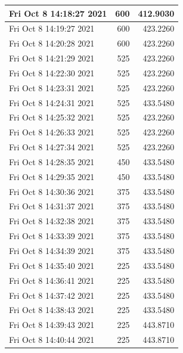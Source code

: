 \begin{longtable}{|l|r|r|}
Fri Oct  8 14:18:27 2021 &                600 &        412.9030 \\ \hline
Fri Oct  8 14:19:27 2021 &                600 &        423.2260 \\ \hline
Fri Oct  8 14:20:28 2021 &                600 &        423.2260 \\ \hline
Fri Oct  8 14:21:29 2021 &                525 &        423.2260 \\ \hline
Fri Oct  8 14:22:30 2021 &                525 &        423.2260 \\ \hline
Fri Oct  8 14:23:31 2021 &                525 &        423.2260 \\ \hline
Fri Oct  8 14:24:31 2021 &                525 &        433.5480 \\ \hline
Fri Oct  8 14:25:32 2021 &                525 &        423.2260 \\ \hline
Fri Oct  8 14:26:33 2021 &                525 &        423.2260 \\ \hline
Fri Oct  8 14:27:34 2021 &                525 &        423.2260 \\ \hline
Fri Oct  8 14:28:35 2021 &                450 &        433.5480 \\ \hline
Fri Oct  8 14:29:35 2021 &                450 &        433.5480 \\ \hline
Fri Oct  8 14:30:36 2021 &                375 &        433.5480 \\ \hline
Fri Oct  8 14:31:37 2021 &                375 &        433.5480 \\ \hline
Fri Oct  8 14:32:38 2021 &                375 &        433.5480 \\ \hline
Fri Oct  8 14:33:39 2021 &                375 &        433.5480 \\ \hline
Fri Oct  8 14:34:39 2021 &                375 &        433.5480 \\ \hline
Fri Oct  8 14:35:40 2021 &                225 &        433.5480 \\ \hline
Fri Oct  8 14:36:41 2021 &                225 &        433.5480 \\ \hline
Fri Oct  8 14:37:42 2021 &                225 &        433.5480 \\ \hline
Fri Oct  8 14:38:43 2021 &                225 &        433.5480 \\ \hline
Fri Oct  8 14:39:43 2021 &                225 &        443.8710 \\ \hline
Fri Oct  8 14:40:44 2021 &                225 &        443.8710 \\ \hline

\end{longtable}
